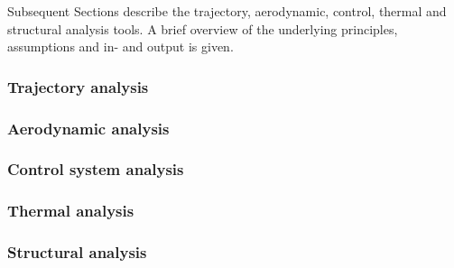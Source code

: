 Subsequent Sections describe the trajectory, aerodynamic, control, thermal and structural analysis tools. A brief overview of the underlying principles, assumptions and in- and output is given.
\subsubsection{Trajectory analysis}\label{subsec:orbittool}


\subsubsection{Aerodynamic analysis}\label{subsec:aerotool}


\subsubsection{Control system analysis}\label{subsec:controltool}


\subsubsection{Thermal analysis}\label{subsec:thermaltool}


\subsubsection{Structural analysis}\label{subsec:structool}






